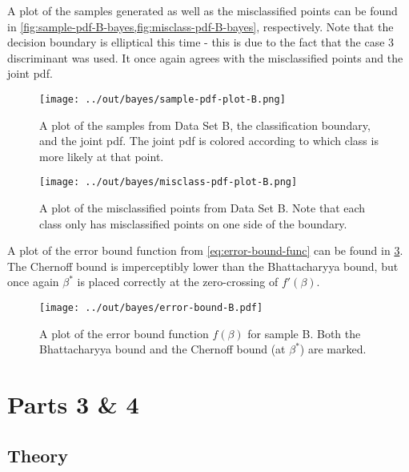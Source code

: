 \documentclass[headings=optiontoheadandtoc,listof=totoc,parskip=full]{scrartcl}
\begin{document}


A plot of the samples generated as well as the misclassified points can be found in \cref{fig:sample-pdf-B-bayes,fig:misclass-pdf-B-bayes}, respectively. Note that the decision boundary is elliptical this time - this is due to the fact that the case 3 discriminant was used. It once again agrees with the misclassified points and the joint pdf.

\begin{figure}[H]
	\centering
	\texttt{[image: ../out/bayes/sample-pdf-plot-B.png]}
	\caption{A plot of the samples from Data Set B, the classification boundary, and the joint pdf. The joint pdf is colored according to which class is more likely at that point.}
	\label{fig:sample-pdf-B-bayes}
\end{figure}


\begin{figure}[H]
	\centering
	\texttt{[image: ../out/bayes/misclass-pdf-plot-B.png]}
	\caption{A plot of the misclassified points from Data Set B. Note that each class only has misclassified points on one side of the boundary.}
	\label{fig:misclass-pdf-B-bayes}
\end{figure}

A plot of the error bound function from \cref{eq:error-bound-func} can be found in \cref{fig:error-bound-B}. The Chernoff bound is imperceptibly lower than the Bhattacharyya bound, but once again $\beta^*$ is placed correctly at the zero-crossing of $f'(\beta)$.

\begin{figure}[H]
	\centering
	\texttt{[image: ../out/bayes/error-bound-B.pdf]}
	\caption{A plot of the error bound function $f(\beta)$ for sample B. Both the Bhattacharyya bound and the Chernoff bound (at $\beta^*$) are marked.}
	\label{fig:error-bound-B}
\end{figure}


\section{Parts 3 \& 4}
\label{sec:part-2}

\subsection{Theory}
\label{sec:part-2-theory}
\end{document}
